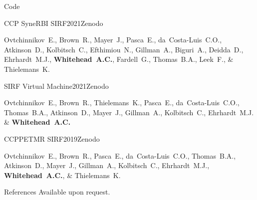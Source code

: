 \documentclass{cv}
\begin{document}
    \begin{rSection}{Code}
        \begin{rSubsection}{CCP SyneRBI SIRF}{2021}{Zenodo}{}
            \item Ovtchinnikov~E., Brown~R., Mayer~J., Pasca~E., da~Costa-Luis~C.O., Atkinson~D., Kolbitsch~C., Efthimiou~N., Gillman~A., Biguri~A., Deidda~D., Ehrhardt~M.J., {\bf Whitehead~A.C.}, Fardell~G., Thomas~B.A., Leek~F., \& Thielemans~K.
        \end{rSubsection}
        
        \begin{rSubsection}{SIRF Virtual Machine}{2021}{Zenodo}{}
            \item Ovtchinnikov~E., Brown~R., Thielemans~K., Pasca~E., da~Costa-Luis~C.O., Thomas~B.A., Atkinson~D., Mayer~J., Gillman~A., Kolbitsch~C., Ehrhardt~M.J. \& {\bf Whitehead~A.C.}
        \end{rSubsection}
        
        \begin{rSubsection}{CCPPETMR SIRF}{2019}{Zenodo}{}
            \item Ovtchinnikov~E., Brown~R., Pasca~E., da~Costa-Luis~C.O., Thomas~B.A., Atkinson~D., Mayer~J., Gillman~A., Kolbitsch~C., Ehrhardt~M.J., {\bf Whitehead~A.C.}, \& Thielemans~K.
        \end{rSubsection}
    \end{rSection}
    
    \begin{rSection}{References}
        Available upon request.
    \end{rSection}
\end{document}

